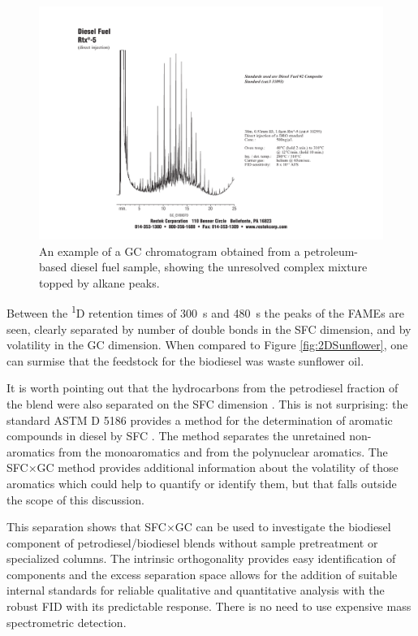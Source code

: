 \begin{figure}
	\centering
	\includegraphics[width=\textwidth]{Figures/hchump.pdf}
	\decoRule	
	
\caption[An example of a petrochemical fuel chromatogram.]{An example of a GC
chromatogram obtained from a petroleum-based diesel fuel sample, showing the
unresolved complex mixture topped by alkane peaks.}
	
	\label{fig:HCHump} 
\end{figure}

Between the \textsuperscript{1}D retention times of \SI{300}{\second} and
\SI{480}{\second} the peaks of the FAMEs are seen, clearly separated by number
of double bonds in the SFC dimension, and by volatility in the GC dimension.
When compared to Figure \ref{fig:2DSunflower}, one can surmise that the
feedstock for the biodiesel was waste sunflower oil.

It is worth pointing out that the hydrocarbons from the petrodiesel
fraction of the blend were also separated on the SFC dimension
\autocite{Venter1999}. This is not surprising: the standard ASTM D 5186 provides
a method for the determination of aromatic compounds in diesel by SFC
\autocite{ASTMD5186}. The method separates the unretained non-aromatics from the
monoaromatics and from the polynuclear aromatics. The SFC×GC method provides
additional information about the volatility of those aromatics which could help
to quantify or identify them, but that falls outside the scope of this
discussion.

This separation shows that SFC×GC can be used to investigate the biodiesel
component of petrodiesel/biodiesel blends without sample pretreatment or
specialized columns. The intrinsic orthogonality provides easy identification of
components and the excess separation space allows for the addition of suitable
internal standards for reliable qualitative and quantitative analysis with the
robust FID with its predictable response. There is no need to use expensive
mass spectrometric detection.

